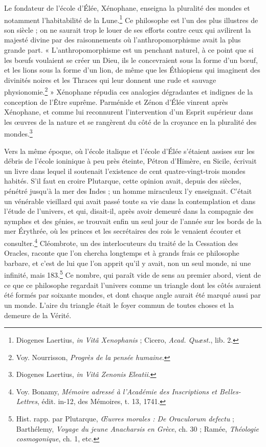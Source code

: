 \documentclass[a4paper, 11pt, oneside, landscape]{article}
\begin{document}
Le fondateur de l'école d'Élée, Xénophane, enseigna la pluralité des mondes et notamment l'habitabilité de la Lune.\footnote{Diogenes Laertius, \emph{in Vitâ Xenophanis} ; Cicero, \emph{Acad. Quæst.}, lib. 2.} Ce philosophe est l'un des plus illustres de son siècle ; on ne saurait trop le louer de ses efforts contre ceux qui avilirent la majesté divine par des raisonnements où l'anthropomorphisme avait la plus grande part. « L'anthropomorphisme est un penchant naturel, à ce point que si les bœufs voulaient se créer un Dieu, ils le concevraient sous la forme d'un bœuf, et les lions sous la forme d'un lion, de même que les Éthiopiens qui imaginent des divinités noires et les Thraces qui leur donnent une rude et sauvage physionomie.\footnote{Voy. Nourrisson, \emph{Progrès de la pensée humaine}.} » Xénophane répudia ces analogies dégradantes et indignes de la conception de l'Être suprême. Parménide et Zénon d'Élée vinrent après Xénophane, et comme lui reconnurent l'intervention d'un Esprit supérieur dans les œuvres de la nature et se rangèrent du côté de la croyance en la pluralité des mondes.\footnote{Diogenes Laertius, \emph{in Vitâ Zenonis Eleatii}.}

Vers la même époque, où l'école italique et l'école d'Élée s'étaient assises sur les débris de l'école ioninique à peu près éteinte, Pétron d'Himère, en Sicile, écrivait un livre dans lequel il soutenait l'existence de cent quatre-vingt-trois mondes habités. S'il faut en croire Plutarque, cette opinion avait, depuis des siècles, pénétré jusqu'à la mer des Indes ; un homme miraculeux l'y enseignait. C'était un vénérable vieillard qui avait passé toute sa vie dans la contemplation et dans l'étude de l'univers, et qui, disait-il, après avoir demeuré dans la compagnie des nymphes et des génies, se trouvait enfin un seul jour de l'année sur les bords de la mer Érythrée, où les princes et les secrétaires des rois le venaient écouter et consulter.\footnote{Voy. Bonamy, \emph{Mémoire adressé à l'Académie des Inscriptions et Belles-Lettres}, édit. in-12, des Mémoires, t. 13, 1741.} Cléombrote, un des interlocuteurs du traité de la Cessation des Oracles, raconte que l'on chercha longtemps et à grands frais ce philosophe barbare, et c'est de lui que l'on apprit qu'il y avait, non un seul monde, ni une infinité, mais 183.\footnote{Hist. rapp. par Plutarque, \emph{Œuvres morales : De Oraculorum defectu} ; Barthélemy, \emph{Voyage du jeune Anacharsis en Grèce}, ch. 30 ; Ramée, \emph{Théologie cosmogonique}, ch. 1, etc.} Ce nombre, qui paraît vide de sens au premier abord, vient de ce que ce philosophe regardait l'univers comme un triangle dont les côtés auraient été formés par soixante mondes, et dont chaque angle aurait été marqué aussi par un monde. L'aire du triangle était le foyer commun de toutes choses et la demeure de la Vérité.
\end{document}
